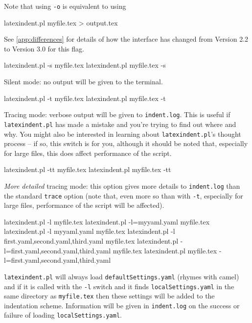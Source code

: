 	Note that using \texttt{-o} is equivalent to using
	\begin{commandshell}
latexindent.pl myfile.tex > output.tex
\end{commandshell}
	See \vref{app:differences} for details of how the interface has changed
	from Version 2.2 to Version 3.0 for this flag.
	\begin{commandshell}
latexindent.pl -s myfile.tex
latexindent.pl myfile.tex -s
      \end{commandshell}

	Silent mode: no output will be given to the terminal.

	\begin{commandshell}
latexindent.pl -t myfile.tex
latexindent.pl myfile.tex -t
      \end{commandshell}

	\label{page:traceswitch}
	Tracing mode: verbose output will be given to \texttt{indent.log}. This
	is useful if \texttt{latexindent.pl} has made a mistake and you're
	trying to find out where and why. You might also be interested in learning
	about \texttt{latexindent.pl}'s thought process -- if so, this
	switch is for you, although it should be noted that, especially for large files, this does affect
	performance of the script.

	\begin{commandshell}
latexindent.pl -tt myfile.tex
latexindent.pl myfile.tex -tt
      \end{commandshell}

	\emph{More detailed} tracing mode: this option gives more details to \texttt{indent.log}
	than the standard \texttt{trace} option (note that, even more so than with \texttt{-t},
	especially for large files, performance of the script will be affected).

	\begin{commandshell}
latexindent.pl -l myfile.tex
latexindent.pl -l=myyaml.yaml myfile.tex
latexindent.pl -l myyaml.yaml myfile.tex
latexindent.pl -l first.yaml,second.yaml,third.yaml myfile.tex
latexindent.pl -l=first.yaml,second.yaml,third.yaml myfile.tex
latexindent.pl myfile.tex -l=first.yaml,second.yaml,third.yaml 
      \end{commandshell}

	\label{page:localswitch}
	\texttt{latexindent.pl} will always load \texttt{defaultSettings.yaml} (rhymes with camel)
	and if it is called with the \texttt{-l} switch and it finds \texttt{localSettings.yaml}
	in the same directory as \texttt{myfile.tex} then these settings will be
	added to the indentation scheme. Information will be given in \texttt{indent.log} on
	the success or failure of loading \texttt{localSettings.yaml}.

